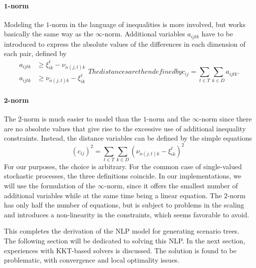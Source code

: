 \paragraph{$\mathbf{1}$-norm} Modeling the $1$-norm in the language of inequalities is more involved, but works basically the same way as the $\infty$-norm. Additional variables $a_{ijtk}$ have to be introduced to express the absolute values of the differences in each dimension of each pair, defined by
\begin{subequations}
\begin{align}
  \label{eq:c-as-1norm-def-a}
  a_{ijtk} &\geq  \xi_{ik}^t - \nu_{n(j,t)k} \\
  a_{ijtk} &\geq  \nu_{n(j,t)k} - \xi_{ik}^t
\end{align}
The distances are then defined by
\begin{equation}
  \label{eq:c-as-1norm}
  c_{ij} = \sum_{t\in T}\sum_{k \in D} a_{ijtk}.
\end{equation}
\end{subequations}
\paragraph{$\mathbf{2}$-norm} The $2$-norm is much easier to model than the $1$-norm and the $\infty$-norm since there are no absolute values that give rise to the excessive use of additional inequality constraints.
Instead, the distance variables can be defined by the simple equations
\begin{equation}
  \label{eq:c-as-2norm}
  \left(c_{ij} \right)^2 = \sum_{t\in T}\sum_{k \in D}\left( \nu_{n(j,t)k} - \xi_{ik}^t \right)^2
\end{equation}
For our purposes, the choice is arbitrary.
For the common case of single-valued stochastic processes, the three definitions coincide.
In our implementations, we will use the formulation of the $\infty$-norm, since it offers the smallest number of additional variables while at the same time being a linear equation.
The $2$-norm has only half the number of equations, but is subject to problems in the scaling and introduces a non-linearity in the constraints, which seems favorable to avoid.

This completes the derivation of the NLP model for generating scenario trees.
The following section will be dedicated to solving this NLP.
In the next section, experiences with KKT-based solvers is discussed.
The solution is found to be problematic, with convergence and local optimality issues.
